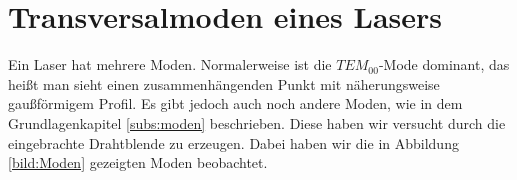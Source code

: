 \section{Transversalmoden eines Lasers}
\label{section:transvM}

Ein Laser hat mehrere Moden. Normalerweise ist die $TEM_{00}$-Mode dominant, das heißt man sieht einen zusammenhängenden 
Punkt mit näherungsweise gaußförmigem Profil. Es gibt jedoch auch noch andere Moden, wie in dem Grundlagenkapitel \ref{subs:moden}
beschrieben. Diese haben wir versucht durch die eingebrachte Drahtblende zu erzeugen. Dabei haben wir die in Abbildung \ref{bild:Moden} gezeigten Moden beobachtet.
\begin{figure}[ht]
    \centering
    \quad
    \quad
    \quad
\end{figure}

